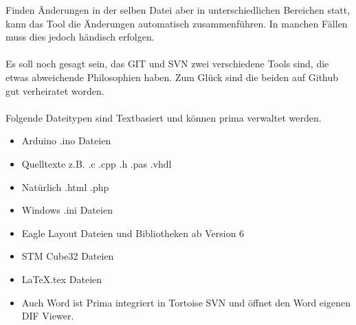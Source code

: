 Finden Änderungen in der selben Datei aber in unterschiedlichen Bereichen statt, kann das Tool die Änderungen automatisch zusammenführen. In manchen Fällen muss dies jedoch händisch erfolgen.\\
\ \\
Es soll noch gesagt sein, das GIT und SVN zwei verschiedene Tools sind, die etwas abweichende Philosophien haben. Zum Glück sind die beiden auf Github gut verheiratet worden.\\
\ \\
Folgende Dateitypen sind Textbasiert und können prima verwaltet werden.
\begin{itemize}
\item Arduino .ino Dateien
\item Quelltexte z.B. .c .cpp .h .pas .vhdl
\item Natürlich .html .php
\item Windows .ini Dateien
\item Eagle Layout Dateien und Bibliotheken ab Version 6
\item STM Cube32 Dateien
\item \LaTeX .tex Dateien
\item Auch Word ist Prima integriert in Tortoise SVN und öffnet den Word eigenen DIF Viewer.
\end{itemize}


